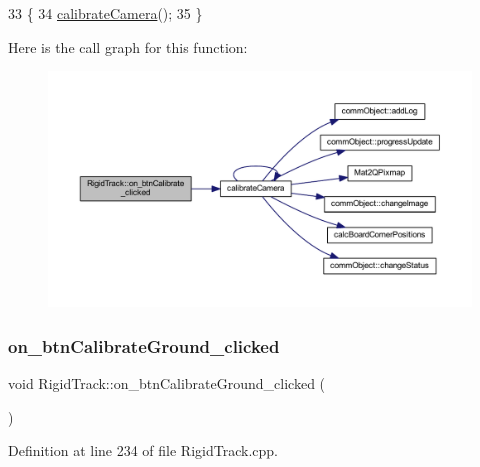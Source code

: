 \begin{DoxyCode}
33 \{
34     \hyperlink{main_8cpp_a5f7c5996cd5a271d0277e0741f73a5b4}{calibrateCamera}();
35 \}
\end{DoxyCode}
Here is the call graph for this function\+:
\nopagebreak
\begin{figure}[H]
\begin{center}
\leavevmode
\includegraphics[width=350pt]{class_rigid_track_aed2c39da404909142074f7dd2ce75a63_cgraph}
\end{center}
\end{figure}
\mbox{\label{class_rigid_track_a9a939d6db3d268e75a603cb3d492a91b}} 
\subsubsection{\texorpdfstring{on\+\_\+btn\+Calibrate\+Ground\+\_\+clicked}{on\_btnCalibrateGround\_clicked}}
{\footnotesize\ttfamily void Rigid\+Track\+::on\+\_\+btn\+Calibrate\+Ground\+\_\+clicked (\begin{DoxyParamCaption}{ }\end{DoxyParamCaption})\hspace{0.3cm}{\ttfamily [slot]}}



Definition at line 234 of file Rigid\+Track.\+cpp.


